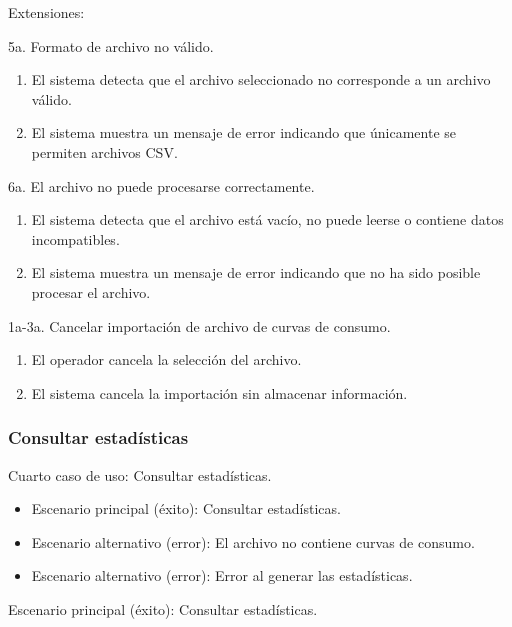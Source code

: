 \documentclass[12pt,a4paper]{report}
\begin{document}
\medskip

\noindent Extensiones:

5a. Formato de archivo no válido.
\begin{enumerate}[leftmargin=1.5cm]
    \item El sistema detecta que el archivo seleccionado no corresponde a un archivo válido.
    \item El sistema muestra un mensaje de error indicando que únicamente se permiten archivos CSV.
\end{enumerate}

\medskip

6a. El archivo no puede procesarse correctamente.
\begin{enumerate}[leftmargin=1.5cm]
    \item El sistema detecta que el archivo está vacío, no puede leerse o contiene datos incompatibles.
    \item El sistema muestra un mensaje de error indicando que no ha sido posible procesar el archivo.
\end{enumerate}

\medskip

1a-3a. Cancelar importación de archivo de curvas de consumo.
\begin{enumerate}[leftmargin=1.5cm]
    \item El operador cancela la selección del archivo.
    \item El sistema cancela la importación sin almacenar información.
\end{enumerate}

\medskip

\subsubsection{Consultar estadísticas}

\noindent Cuarto caso de uso: Consultar estadísticas.

\begin{itemize}[leftmargin=1.5cm]
    \item Escenario principal (éxito): Consultar estadísticas.
    \item Escenario alternativo (error): El archivo no contiene curvas de consumo.
    \item Escenario alternativo (error): Error al generar las estadísticas.
\end{itemize}

\medskip

\noindent Escenario principal (éxito): Consultar estadísticas.
\end{document}

